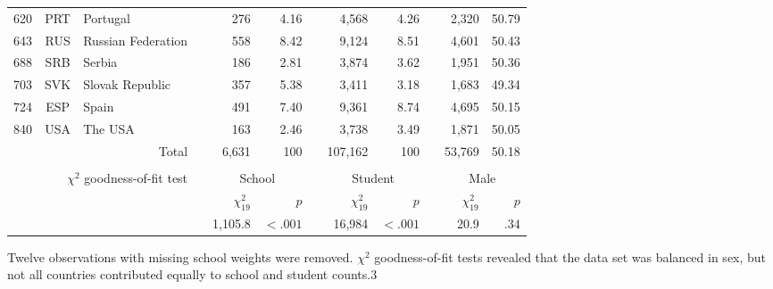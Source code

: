 {\begin{tabular}{ccl c rr c rr c rr}
      620   & PRT   & Portugal &       & 276   & 4.16 &       & 4,568  & 4.26 &       & 2,320  & 50.79 \\
      643   & RUS   & Russian Federation &       & 558   & 8.42 &       & 9,124  & 8.51 &       & 4,601  & 50.43 \\
      688   & SRB   & Serbia &       & 186   & 2.81 &       & 3,874  & 3.62 &       & 1,951  & 50.36 \\
      703   & SVK   & Slovak Republic &       & 357   & 5.38 &       & 3,411  & 3.18 &       & 1,683  & 49.34 \\
      724   & ESP   & Spain &       & 491   & 7.40 &       & 9,361  & 8.74 &       & 4,695  & 50.15 \\
      840   & USA   & The USA &       & 163   & 2.46 &       & 3,738  & 3.49 &       & 1,871  & 50.05 \\
      \bottomrule
            &       & \multicolumn{1}{r}{Total} &       & 6,631  & 100 &       & 107,162 & 100 &       & 53,769 & 50.18 \\
      &&&&&&&&&&&\\
      \multicolumn{3}{r}{$\chi^2$ goodness-of-fit test} && \multicolumn{2}{c}{School} &       & \multicolumn{2}{c}{Student} &       & \multicolumn{2}{c}{Male} \\
      \cmidrule{5-6}\cmidrule{8-9}\cmidrule{11-12}
      &&&& $\chi^2_{19}$ & $p$ && $\chi^2_{19}$ & $p$ && $\chi^2_{19}$ & $p$\\
      \cmidrule{5-12}
      &&&& 1,105.8 & $<.001$ && 16,984 & $<.001$ && 20.9 & $.34$\\
      \end{tabular}
}{Twelve observations with missing school weights were removed. $\chi^2$ goodness-of-fit tests revealed that the data set was balanced in sex, but not all countries contributed equally to school and student counts.}{3}